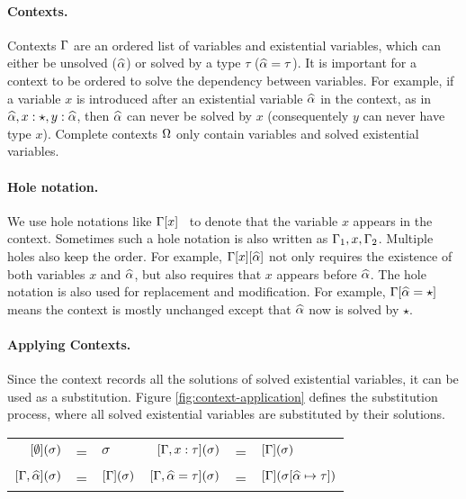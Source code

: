 \paragraph{Contexts.}
Contexts $\Gamma$ are an ordered list of variables and
existential variables, which
can either be unsolved
($\widehat{\alpha}$) or solved by a type $\tau$ ($\widehat{\alpha} = \tau$).
It is important for a context to be ordered to solve the dependency between
variables. For example, if a variable $x$ is introduced after
an existential variable $\widehat{\alpha}$
in the context, as in
$\widehat{\alpha}, x:\star, y :\widehat{\alpha}$,
then $\widehat{\alpha}$ can never be solved by $x$ (consequentely $y$ can never have type $x$).
Complete contexts $\Omega$ only contain variables and solved existential variables.

\paragraph{Hole notation.}
We use hole notations like $\Gamma[x]$~\citep{dunfield2013complete} to
denote that the variable $x$ appears in the context. Sometimes such a
hole notation is also written as $\Gamma_1, x, \Gamma_2$.
Multiple holes also keep the order. For example, $\Gamma[x][\widehat{\alpha}]$ not only
requires the existence of both variables $x$ and $\widehat{\alpha}$, but also requires that
$x$ appears before $\widehat{\alpha}$.
The hole notation is also used for replacement and modification. For example,
$\Gamma[\widehat{\alpha} = \star]$ means the context is mostly unchanged except
that $\widehat{\alpha}$ now is solved by $\star$.

\paragraph{Applying Contexts.} Since the context records all the solutions of
solved existential variables, it can be used as a substitution. Figure
\ref{fig:context-application} defines the substitution process, where all solved
existential variables are substituted by their solutions.

\begin{figure*}[t]
  \centering
  \begin{tabular}{rlp{2cm}rll}
    $[\emptyset](\sigma)$ & = & $\sigma$ &
    $[\Gamma, x: \tau](\sigma)$ & = & $[\Gamma](\sigma)$ \\
    $[\Gamma, \widehat{\alpha}](\sigma)$ & = & $[\Gamma](\sigma)$ &
    $[\Gamma, \widehat{\alpha} = \tau](\sigma)$ & = & $[\Gamma](\sigma [\widehat{\alpha} \mapsto \tau])$\\
  \end{tabular}
    \caption{Context application.}
    \label{fig:context-application}
\end{figure*}

